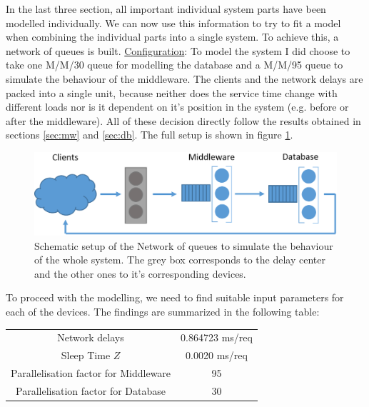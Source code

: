 \documentclass[11pt]{article}
\begin{document}
In the last three section, all important individual system parts have been modelled individually. We can now use this information to try to fit a model when combining the individual parts into a single system. To achieve this, a network of queues is built.
\newline\underline{Configuration}: To model the system I did choose to take one M/M/30 queue for modelling the database and a M/M/95 queue to simulate the behaviour of the middleware. The clients and the network delays are packed into a single unit, because neither does the service time change with different loads nor is it dependent on it's position in the system (e.g. before or after the middleware). All of these decision directly follow the results obtained in sections \ref{sec:mw} and \ref{sec:db}. The full setup is shown in figure \ref{fig:networkofqueues}.
\begin{figure}[!htb]
\centering
\includegraphics[width=1.0\linewidth]{figures/mva/networkofqueues}
\caption{Schematic setup of the Network of queues to simulate the behaviour of the whole system. The grey box corresponds to the delay center and the other ones to it's corresponding devices.}
\label{fig:networkofqueues}
\end{figure}
To proceed with the modelling, we need to find suitable input parameters for each of the devices. The findings are summarized in the following table:
\begin{center}
	\begin{tabular}{c|c}
		\hline
		Network delays & 0.864723 ms/req \\
		Sleep Time $Z$ & 0.0020 ms/req \\
		Parallelisation factor for Middleware & 95 \\
		Parallelisation factor for Database & 30 \\
		\hline
	\end{tabular}
	\label{tbl:params}
\end{center}
\end{document}

